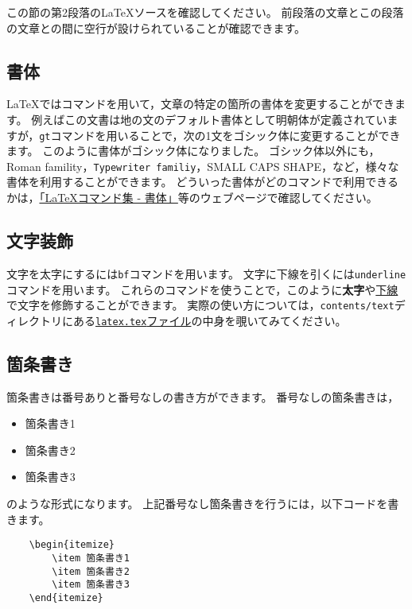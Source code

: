 この節の第2段落のLaTeXソースを確認してください。
前段落の文章とこの段落の文章との間に空行が設けられていることが確認できます。


\subsection{書体}
LaTeXではコマンドを用いて，文章の特定の箇所の書体を変更することができます。
例えばこの文書は地の文のデフォルト書体として明朝体が定義されていますが，{\tt gt}コマンドを用いることで，次の1文をゴシック体に変更することができます。
{\gt このように書体がゴシック体になりました。}
{\gt ゴシック体}以外にも，{\rm Roman famility}，{\tt Typewriter familiy}，{\sc SMALL CAPS SHAPE}，など，様々な書体を利用することができます。
どういった書体がどのコマンドで利用できるかは，\href{http://www.latex-cmd.com/style/style.html}{「LaTeXコマンド集 - 書体」}等のウェブページで確認してください。


\subsection{文字装飾}
文字を太字にするには{\tt bf}コマンドを用います。
文字に下線を引くには{\tt underline}コマンドを用います。
これらのコマンドを使うことで，このように{\bf 太字}や\underline{下線}で文字を修飾することができます。
実際の使い方については，\texttt{contents/text}ディレクトリにある\href{https://github.com/ymmt3-lab/DEIM-and-Thesis/blob/master/contents/text/latex.tex}{\texttt{latex.tex}ファイル}の中身を覗いてみてください。


\subsection{箇条書き}
箇条書きは番号ありと番号なしの書き方ができます。
番号なしの箇条書きは，
\begin{itemize}
\item 箇条書き1
\item 箇条書き2
\item 箇条書き3
\end{itemize}
のような形式になります。
上記番号なし箇条書きを行うには，以下コードを書きます。
\begin{verbatim}
    \begin{itemize}
        \item 箇条書き1
        \item 箇条書き2
        \item 箇条書き3
    \end{itemize}
\end{verbatim}

